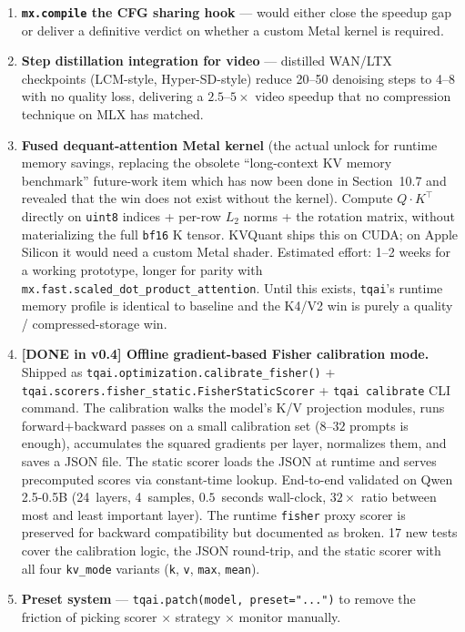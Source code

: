 \documentclass[11pt,a4paper]{article}
\begin{document}
\begin{enumerate}[label=\arabic*.]
  \item \textbf{\texttt{mx.compile} the CFG sharing hook} --- would either close the speedup gap or deliver a definitive verdict on whether a custom Metal kernel is required.
  \item \textbf{Step distillation integration for video} --- distilled WAN/LTX checkpoints (LCM-style, Hyper-SD-style) reduce 20--50 denoising steps to 4--8 with no quality loss, delivering a $2.5$--$5\times$ video speedup that no compression technique on MLX has matched.
  \item \textbf{Fused dequant-attention Metal kernel} (the actual unlock for runtime memory savings, replacing the obsolete ``long-context KV memory benchmark'' future-work item which has now been done in Section~10.7 and revealed that the win does not exist without the kernel). Compute $Q \cdot K^\top$ directly on \texttt{uint8} indices + per-row $L_2$ norms + the rotation matrix, without materializing the full \texttt{bf16} K tensor. KVQuant ships this on CUDA; on Apple Silicon it would need a custom Metal shader. Estimated effort: 1--2 weeks for a working prototype, longer for parity with \texttt{mx.fast.scaled\_dot\_product\_attention}. Until this exists, \texttt{tqai}'s runtime memory profile is identical to baseline and the K4/V2 win is purely a quality / compressed-storage win.
  \item \textbf{[DONE in v0.4] Offline gradient-based Fisher calibration mode.} Shipped as \texttt{tqai.optimization.calibrate\_fisher()} + \texttt{tqai.scorers.fisher\_static.FisherStaticScorer} + \texttt{tqai calibrate} CLI command. The calibration walks the model's K/V projection modules, runs forward+backward passes on a small calibration set ($8$--$32$ prompts is enough), accumulates the squared gradients per layer, normalizes them, and saves a JSON file. The static scorer loads the JSON at runtime and serves precomputed scores via constant-time lookup. End-to-end validated on Qwen 2.5-0.5B (24~layers, 4~samples, $0.5$~seconds wall-clock, $32\times$ ratio between most and least important layer). The runtime \texttt{fisher} proxy scorer is preserved for backward compatibility but documented as broken. 17 new tests cover the calibration logic, the JSON round-trip, and the static scorer with all four \texttt{kv\_mode} variants (\texttt{k}, \texttt{v}, \texttt{max}, \texttt{mean}).
  \item \textbf{Preset system} --- \texttt{tqai.patch(model, preset="...")} to remove the friction of picking scorer $\times$ strategy $\times$ monitor manually.

\end{enumerate}
\end{document}
